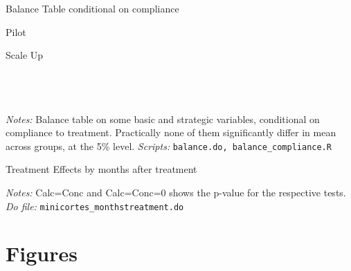 \documentclass[11pt]{article}
\begin{document}
\begin{table}[H]
    \caption{Balance Table conditional on compliance}
    \label{Table_balance}
    \begin{subtable}{1\textwidth}
      \centering
        \caption{Pilot}
        \scriptsize{}
    \end{subtable}%
    
    \bigskip
    \begin{subtable}{1\textwidth}
      \centering
        \caption{Scale Up}
        \scriptsize{}
    \end{subtable}
           \footnotesize 
           \\
           \\
           \\
  \textit{Notes:} 
    Balance table on some basic and strategic variables, conditional on compliance to treatment. Practically none of them significantly differ in mean across groups, at the 5\% level.
    \textit{Scripts: } \texttt{balance.do, balance\_compliance.R}
\end{table}



\pagebreak

\begin{table}[H]
    \caption{Treatment Effects by months after treatment}
    \label{Table_effects_F}
    \begin{center}
    \scriptsize{}
    \end{center}
    \footnotesize
    \textit{Notes:} 
    Calc=Conc and Calc=Conc=0 shows the p-value for the respective tests.
    \textit{Do file: } \texttt{minicortes\_monthstreatment.do}
\end{table}





\pagebreak





\section{Figures}
\end{document}
